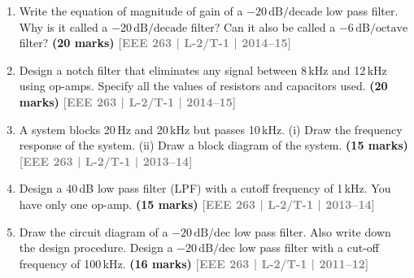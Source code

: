 \documentclass[12pt]{article}
\newcommand{\yr}[1]{\hfill\textcolor{gray}{\small\textbf{[#1]}}}
\newcommand{\mk}[1]{\textcolor{orange!70!black}{\small\textbf{(#1 marks)}}}
\begin{document}
\begin{enumerate}
\begin{center}
\end{center}
\mk{23} \yr{EEE 263 | L-2/T-1 | 2015--16}


\item Write the equation of magnitude of gain of a $-20\,\text{dB/decade}$ low pass filter. Why is it called a $-20\,\text{dB/decade}$ filter? Can it also be called a $-6\,\text{dB/octave}$ filter?
\mk{20} \yr{EEE 263 | L-2/T-1 | 2014--15}


\item Design a notch filter that eliminates any signal between 8\,kHz and 12\,kHz using op-amps. Specify all the values of resistors and capacitors used.
\mk{20} \yr{EEE 263 | L-2/T-1 | 2014--15}


\item A system blocks 20\,Hz and 20\,kHz but passes 10\,kHz. (i) Draw the frequency response of the system. (ii) Draw a block diagram of the system.
\mk{15} \yr{EEE 263 | L-2/T-1 | 2013--14}


\item Design a 40\,dB low pass filter (LPF) with a cutoff frequency of 1\,kHz. You have only one op-amp.
\mk{15} \yr{EEE 263 | L-2/T-1 | 2013--14}


\item Draw the circuit diagram of a $-20\,\text{dB/dec}$ low pass filter. Also write down the design procedure. Design a $-20\,\text{dB/dec}$ low pass filter with a cut-off frequency of 100\,kHz.
\mk{16} \yr{EEE 263 | L-2/T-1 | 2011--12}


\end{enumerate}
\end{document}
